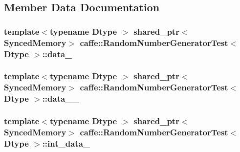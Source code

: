 \subsection{Member Data Documentation}
\hypertarget{classcaffe_1_1_random_number_generator_test_a0d9fe79538e2af9fdd25f93a4fe3efe8}{
\subsubsection[{data\+\_\+}]{\setlength{\rightskip}{0pt plus 5cm}template$<$typename Dtype $>$ shared\+\_\+ptr$<${\bf Synced\+Memory}$>$ {\bf caffe\+::\+Random\+Number\+Generator\+Test}$<$ Dtype $>$\+::data\+\_\+\hspace{0.3cm}{\ttfamily [protected]}}}\label{classcaffe_1_1_random_number_generator_test_a0d9fe79538e2af9fdd25f93a4fe3efe8}
\hypertarget{classcaffe_1_1_random_number_generator_test_aa5d1f3c85e7b05ddae63a96ef858f208}{
\subsubsection[{data\+\_\+2\+\_\+}]{\setlength{\rightskip}{0pt plus 5cm}template$<$typename Dtype $>$ shared\+\_\+ptr$<${\bf Synced\+Memory}$>$ {\bf caffe\+::\+Random\+Number\+Generator\+Test}$<$ Dtype $>$\+::data\+\_\+\_\+\hspace{0.3cm}{\ttfamily [protected]}}}\label{classcaffe_1_1_random_number_generator_test_aa5d1f3c85e7b05ddae63a96ef858f208}
\hypertarget{classcaffe_1_1_random_number_generator_test_a1db28be8828105cc9c187fc6717eef0a}{
\subsubsection[{int\+\_\+data\+\_\+}]{\setlength{\rightskip}{0pt plus 5cm}template$<$typename Dtype $>$ shared\+\_\+ptr$<${\bf Synced\+Memory}$>$ {\bf caffe\+::\+Random\+Number\+Generator\+Test}$<$ Dtype $>$\+::int\+\_\+data\+\_\+\hspace{0.3cm}{\ttfamily [protected]}}}\label{classcaffe_1_1_random_number_generator_test_a1db28be8828105cc9c187fc6717eef0a}
